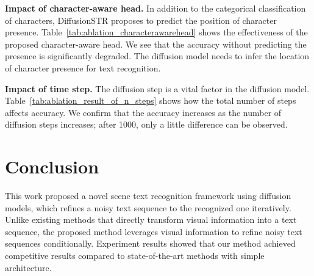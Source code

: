 \documentclass{article}
\begin{document}
\noindent
\textbf{Impact of character-aware head.}
In addition to the categorical classification of characters, DiffusionSTR proposes to predict the position of character presence.
Table~\ref{tab:ablation_characterawarehead} shows the effectiveness of the proposed character-aware head.
We see that the accuracy without predicting the presence is significantly degraded.
The diffusion model needs to infer the location of character presence for text recognition.


\begin{table}[tb]
    \centering
    \caption{
    \textbf{Impact of the time step . }
    }
    \vspace*{-0.75\baselineskip}
    \label{tab:ablation_result_of_n_steps}
    \vspace*{-1.00\baselineskip}
\end{table}


\noindent
\textbf{Impact of time step.}
The diffusion step is a vital factor in the diffusion model.
Table~\ref{tab:ablation_result_of_n_steps} shows how the total number of steps affects accuracy.
We confirm that the accuracy increases as the number of diffusion steps increases; after 1000, only a little difference can be observed.
 
\section{Conclusion}\label{sec:conclusion}
This work proposed a novel scene text recognition framework using diffusion models, which refines a noisy text sequence to the recognized one iteratively.
Unlike existing methods that directly transform visual information into a text sequence, the proposed method leverages visual information to refine noisy text sequences conditionally.
Experiment results showed that our method achieved competitive results compared to state-of-the-art methods with simple architecture. 
\clearpage

{\small


}
\end{document}

